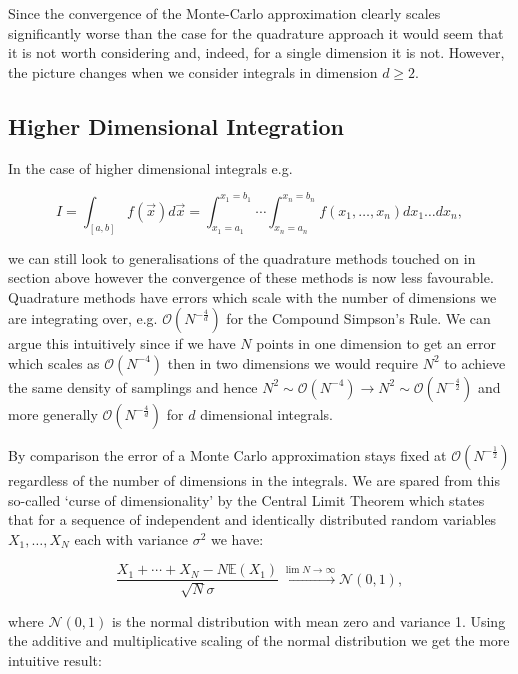 	Since the convergence of the Monte-Carlo approximation clearly scales significantly worse than the case for the quadrature approach it would seem
	that it is not worth considering and, indeed, for a single dimension it is not. However, the picture changes when we consider
	integrals in dimension $d\geq2$.

	\subsection{Higher Dimensional Integration}
	\label{sub:MCND}

	In the case of higher dimensional integrals e.g.

	\begin{equation}
		I = \int_{[a, b]}f(\vec{x})d\vec{x} = \int_{x_1=a_1}^{x_1=b_1}\cdots\int_{x_n=a_n}^{x_n=b_n}f(x_1, \ldots, x_n)dx_1\ldots dx_n,
	\end{equation}

	we can still look to generalisations of the quadrature methods touched on in section above however the convergence of
	these methods is now less favourable.  Quadrature methods have errors which scale with the number of dimensions we are integrating over,
	e.g. $\mathcal{O}(N^{-\frac{4}{d}})$ for the Compound Simpson's Rule.  We can argue this intuitively since if we have $N$ points in one
	dimension to get an error which scales as $\mathcal{O}(N^{-4})$ then in two dimensions we would require $N^2$ to achieve
	the same density of samplings and hence $N^2\sim\mathcal{O}(N^{-4})\to N^2\sim\mathcal{O}(N^{-\frac{4}{2}})$ and more generally
	$\mathcal{O}(N^{-\frac{4}{d}})$ for $d$ dimensional integrals.

	By comparison the error of a Monte Carlo approximation stays fixed at $\mathcal{O}(N^{-\frac{1}{2}})$ regardless of the number of
	dimensions in the integrals.  We are spared from this so-called `curse of dimensionality' by the Central Limit Theorem
	which states that for a sequence of independent and identically distributed random variables $X_1, \ldots, X_N$ each with
	variance $\sigma^2$ we have:

	\begin{equation}
		\frac{X_1 + \cdots + X_N - N\mathbb{E}(X_1)}{\sqrt{N}\sigma}\xrightarrow{\lim{N\rightarrow\infty}}\mathcal{N}(0, 1),
	\end{equation}

	\noindent where $\mathcal{N}(0, 1)$ is the normal distribution with mean zero and variance 1.  Using the additive and multiplicative scaling
	of the normal distribution we get the more intuitive result:

